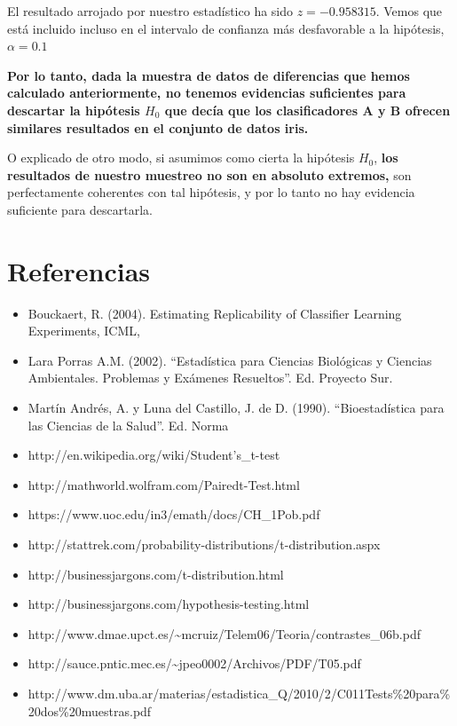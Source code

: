 \documentclass[11pt]{article}
\begin{document}
El resultado arrojado por nuestro estadístico ha sido \(z=-0.958315\).
Vemos que está incluido incluso en el intervalo de confianza más
desfavorable a la hipótesis, \(\alpha = 0.1\)

\textbf{Por lo tanto, dada la muestra de datos de diferencias que hemos
calculado anteriormente, no tenemos evidencias suficientes para
descartar la hipótesis \(H_0\) que decía que los clasificadores A y B
ofrecen similares resultados en el conjunto de datos iris.}

O explicado de otro modo, si asumimos como cierta la hipótesis \(H_0\),
\textbf{los resultados de nuestro muestreo no son en absoluto extremos,}
son perfectamente coherentes con tal hipótesis, y por lo tanto no hay
evidencia suficiente para descartarla.

    \section{Referencias}\label{referencias}

\begin{itemize}
\item
  Bouckaert, R. (2004). Estimating Replicability of Classifier Learning
  Experiments, ICML,
\item
  Lara Porras A.M. (2002). ``Estadística para Ciencias Biológicas y
  Ciencias Ambientales. Problemas y Exámenes Resueltos''. Ed. Proyecto
  Sur.
\item
  Martín Andrés, A. y Luna del Castillo, J. de D. (1990).
  ``Bioestadística para las Ciencias de la Salud''. Ed. Norma
\item
  http://en.wikipedia.org/wiki/Student's\_t-test
\item
  http://mathworld.wolfram.com/Pairedt-Test.html
\item
  https://www.uoc.edu/in3/emath/docs/CH\_1Pob.pdf
\item
  http://stattrek.com/probability-distributions/t-distribution.aspx
\item
  http://businessjargons.com/t-distribution.html
\item
  http://businessjargons.com/hypothesis-testing.html
\item
  http://www.dmae.upct.es/\textasciitilde{}mcruiz/Telem06/Teoria/contrastes\_06b.pdf
\item
  http://sauce.pntic.mec.es/\textasciitilde{}jpeo0002/Archivos/PDF/T05.pdf
\item
  http://www.dm.uba.ar/materias/estadistica\_Q/2010/2/C011Tests\%20para\%20dos\%20muestras.pdf
\end{itemize}


    
    
    
    
\end{document}
